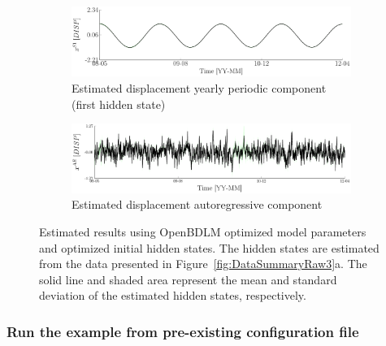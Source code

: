 \begin{figure}[h!]
\ContinuedFloat
\begin{subfigure}{\linewidth}
\includegraphics[width=0.9\linewidth]{./docfigs/Example_DISPSIM_ANOMALY/optim_param_optim_initialhiddenstate/DISP_S1_4.pdf}
\caption{Estimated displacement yearly periodic component (first hidden state)}
\end{subfigure}
\begin{subfigure}{\linewidth}
\includegraphics[width=0.9\linewidth]{./docfigs/Example_DISPSIM_ANOMALY/optim_param_optim_initialhiddenstate/DISP_AR_6.pdf} 
\caption{Estimated displacement autoregressive component}
\end{subfigure}
\caption{Estimated results using OpenBDLM optimized model parameters and optimized initial hidden states. The hidden states are estimated from the data presented in Figure~\ref{fig:DataSummaryRaw3}a. The solid line and shaded area represent the mean and standard deviation of the estimated hidden states, respectively.}
\label{fig:DISPSIMANOMALYOptimizedOptimizedExample3}
\end{figure}



\subsubsection{Run the example from pre-existing configuration file}
\label{SS:LoadConfigFileEx3}

